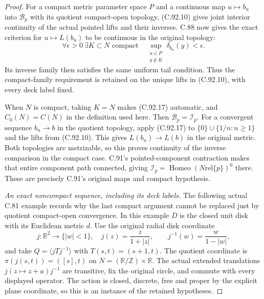\begin{proof}
For a compact metric parameter space $P$ and a continuous
map $u\mapsto b_u$ into $\mathscr B_p$ with its quotient
compact-open topology, (C.92.10) gives joint interior continuity
of the actual pointed lifts and their inverses. C.88 now gives
the exact criterion for $u\mapsto L(b_u)$ to be continuous
in the original topology:
\[
 \forall\epsilon>0\ \exists K\subset N\text{ compact}\quad
 \sup_{\substack{u\in P\\y\notin K}}\delta_{b_u}(y)<\epsilon .
                                                               \tag{C.92.17}
\]
Its inverse family then satisfies the same uniform tail
condition. Thus the compact-family requirement is retained
on the unique lifts in (C.92.10), with every deck label fixed.

When $N$ is compact, taking $K=N$ makes (C.92.17) automatic,
and $C_0(N)=C(N)$ in the definition used here.
Then $\mathscr B_p=\mathscr I_p$.
For a convergent sequence $b_n\to b$ in the quotient topology,
apply (C.92.17) to $\{0\}\cup\{1/n:n\geq1\}$ and the lifts from
(C.92.10). This gives $L(b_n)\to L(b)$ in the original metric.
Both topologies are metrizable, so this proves continuity
of the inverse comparison in the compact case.
C.91's pointed-component contraction makes that entire
component path connected, giving
$\mathscr I_p=\operatorname{Homeo}(N\mathbin{\mathrm{rel}}\{p\})^0$
there. These are precisely C.91's original maps and compact
hypothesis.

\emph{An exact noncompact sequence, including its deck labels.}
The following actual C.81 example records why the last compact
argument cannot be replaced just by quotient compact-open
convergence. In this example $\overline D$ is the closed unit disk with its
Euclidean metric $d$. Use the original radial disk coordinate
\[
 j:\mathbb R^2\to\{|w|<1\},\quad j(z)=\frac{z}{1+|z|},
 \qquad j^{-1}(w)=\frac{w}{1-|w|},
                                                               \tag{C.92.18}
\]
and take $Q=\langle jTj^{-1}\rangle$ with
$T(s,t)=(s+1,t)$. The quotient coordinate is
$\pi(j(s,t))=([s],t)$ on $N=(\mathbb R/\mathbb Z)\times\mathbb R$.
The actual extended translations $j(z\mapsto z+a)j^{-1}$
are transitive, fix the original circle, and commute with
every displayed operator. The action is closed, discrete,
free and proper by the explicit plane coordinate, so this
is an instance of the retained hypotheses.


\end{proof}
